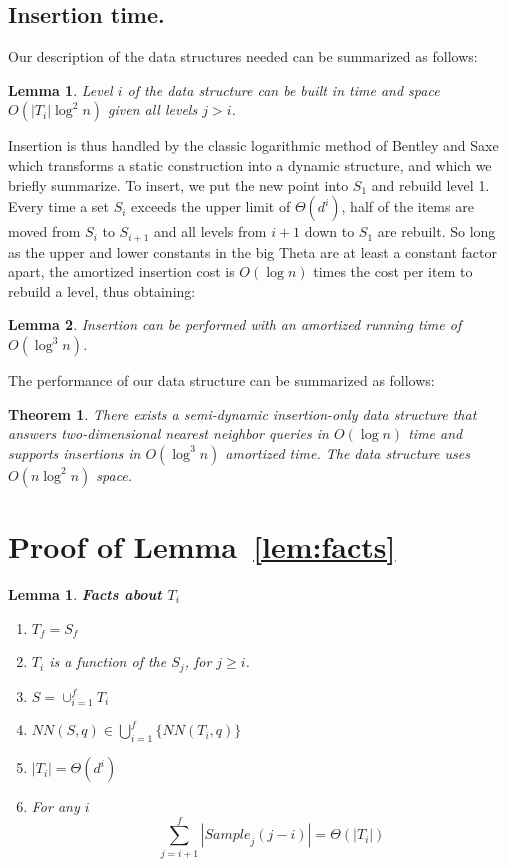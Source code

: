 \documentclass[12pt,a4paper,USenglish,cleveref, autoref, thm-restate]{article}
\newcommand{\Sample}{\mathit{Sample}}
\newcommand{\NN}{\mathit{NN}}
\newtheorem{theorem}{Theorem}
\newtheorem{lemma}{Lemma}
\newcommand{\Sample}{\mathit{Sample}}
\newcommand{\NN}{\mathit{NN}}
\newcommand{\Sample}{\mathit{Sample}}
\newcommand{\NN}{\mathit{NN}}
\begin{document}
\subsection{Insertion time.} \label{sec:insert}

Our description of the data structures needed can be summarized as follows:

\begin{lemma}
    Level $i$ of the data structure can be built in time and space $O(|T_i| \log^2 n)$ given all levels $j>i$.
\end{lemma}

Insertion is thus handled by the classic 
logarithmic method of Bentley and Saxe~\cite{BentleyS80} which transforms a static construction into a dynamic structure, and which we briefly summarize. To insert, we put the new point into $S_1$ and rebuild level 1. Every time a set $S_i$ exceeds the upper limit of $\Theta(d^i)$, half of the items are moved from $S_i$ to $S_{i+1}$ and all levels from $i+1$ down to $S_1$ are rebuilt. So long as the upper and lower constants in the big Theta are at least a constant factor apart, the amortized insertion cost is $O(\log n)$ times the cost per item to rebuild a level, thus obtaining:

\begin{lemma}
    Insertion can be performed with an amortized running time of $O(\log^3 n)$.
\end{lemma}
The performance of our data structure can be summarized as follows:
\begin{theorem}
  \label{theor:semidyn1}
  There exists a semi-dynamic insertion-only data structure that answers two-dimensional nearest neighbor queries in $O(\log n)$ time and supports insertions  in $O(\log^3 n)$ amortized time.  The data structure uses $O(n \log^2 n)$ space. 
\end{theorem}






\appendix

\newtheorem{restatedlemma}{Lemma}

\section{Proof of Lemma~\ref{lem:facts}}
\label{sec:lemma1}
\begin{restatedlemma}{\bf Facts about $T_i$}  
	\begin{enumerate}
 \setlength{\itemsep}{1pt}
\setlength{\parskip}{0pt}
\setlength{\parsep}{0pt} 
    \item $T_{f}=S_{f}$
    \item $T_i$ is a function of the $S_j$, for $j \geq i$.
    \item $S=\cup_{i=1}^{f} T_i$
    \item $\NN(S,q) \in \bigcup_{i=1}^f \{ \NN(T_i,q)\} $
    \item $|T_i| = \Theta(d^i)$
    \item For any $i$
	$$ \sum_{j=i+1}^f |\Sample_j(j-i)|=\Theta(|T_i|)$$
\end{enumerate}
\end{restatedlemma}
\end{document}
